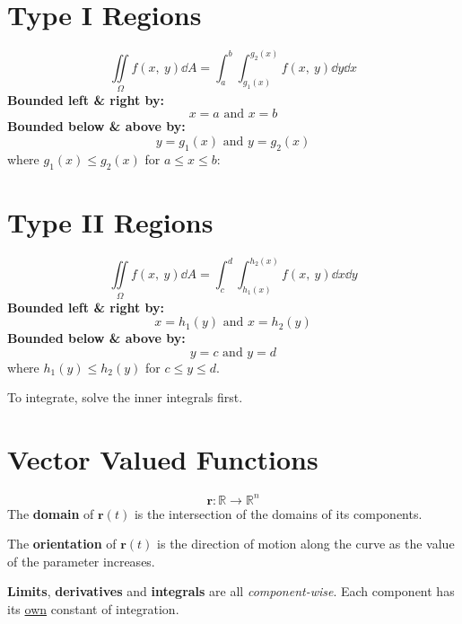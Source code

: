 \documentclass{article}
\begin{document}
\begin{multicols}{3}
    \section*{Type I Regions}
    \begin{equation*}
        \iint\limits_{\Omega} f(x,\: y) \dd{A} = \int_a^b\int_{g_1(x)}^{g_2(x)} f(x,\: y) \dd{y} \dd{x}
    \end{equation*}
    \textbf{Bounded left \& right by:}
    \begin{equation*}
        x=a \text{ and } x=b
    \end{equation*}
    \textbf{Bounded below \& above by:}
    \begin{equation*}
        y=g_1(x) \text{ and } y=g_2(x)
    \end{equation*}
    where \(g_1(x) \leq g_2(x)\) for \(a \leq x \leq b\):
    \section*{Type II Regions}
    \begin{equation*}
        \iint\limits_{\Omega} f(x,\: y) \dd{A} = \int_c^d\int_{h_1(x)}^{h_2(x)} f(x,\: y) \dd{x} \dd{y}
    \end{equation*}
    \textbf{Bounded left \& right by:}
    \begin{equation*}
        x=h_1(y) \text{ and } x=h_2(y)
    \end{equation*}
    \textbf{Bounded below \& above by:}
    \begin{equation*}
        y=c \text{ and } y=d
    \end{equation*}
    where \(h_1(y) \leq h_2(y)\) for \(c \leq y \leq d\).

    To integrate, solve the inner integrals first.
    \section*{Vector Valued Functions}
    \begin{equation*}
        \symbf{r}:\mathbb{R} \to \mathbb{R}^n
    \end{equation*}
    The \textbf{domain} of \(\symbf{r}(t)\) is the intersection of the domains
    of its components.

    The \textbf{orientation} of \(\symbf{r}(t)\) is the direction of motion along the
    curve as the value of the parameter increases.

    \textbf{Limits}, \textbf{derivatives} and \textbf{integrals} are all \textit{component-wise}. Each component has its \underline{own} constant of integration.

\end{multicols}
\end{document}
